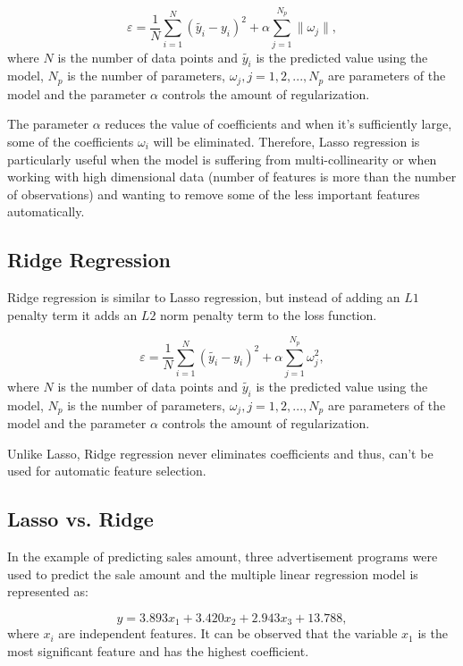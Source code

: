 {\begin{equation}\label{eq:Lassocost}
  \varepsilon = \frac{1}{N}\sum_{i=1}^N (\tilde{y_i}-y_i)^2 + \alpha \sum_{j = 1}^{N_p} \parallel \omega_j \parallel,
\end{equation} where $N$ is the number of data points and $\tilde{y_i}$ is the predicted value using the model, $N_p$ is the number of parameters, $\omega_j, j = 1, 2, ..., N_p$ are parameters of the model and the parameter $\alpha$ controls the amount of regularization.

The parameter $\alpha$ reduces the value of coefficients and when it's sufficiently large, some of the coefficients $\omega_i$ will be eliminated. Therefore, Lasso regression is particularly useful when the model is suffering from multi-collinearity or when working with high dimensional data (number of features is more than the number of observations) and wanting to remove some of the less important features automatically.


\subsection{Ridge Regression}
Ridge regression is similar to Lasso regression, but instead of adding an $L1$ penalty term it adds an $L2$ norm penalty term to the loss function.

\begin{equation}\label{eq:ridgecost}
  \varepsilon = \frac{1}{N}\sum_{i=1}^N (\tilde{y_i}-y_i)^2 + \alpha \sum_{j = 1}^{N_p} \omega_j ^2,
\end{equation} where $N$ is the number of data points and $\tilde{y_i}$ is the predicted value using the model, $N_p$ is the number of parameters, $\omega_j, j = 1, 2, ..., N_p$ are parameters of the model and the parameter $\alpha$ controls the amount of regularization.

Unlike Lasso, Ridge regression never eliminates coefficients and thus, can't be used for automatic feature selection.

\newpage
\subsection{Lasso vs. Ridge}
In the example of predicting sales amount, three advertisement programs were used to predict the sale amount and the multiple linear regression model is represented as:

\begin{equation}\label{eq:polyResult}
  y = 3.893 x_1 + 3.420 x_2 + 2.943 x_3 + 13.788,
\end{equation} where $x_i$ are independent features. It can be observed that the variable $x_1$ is the most significant feature and has the highest coefficient.

}
